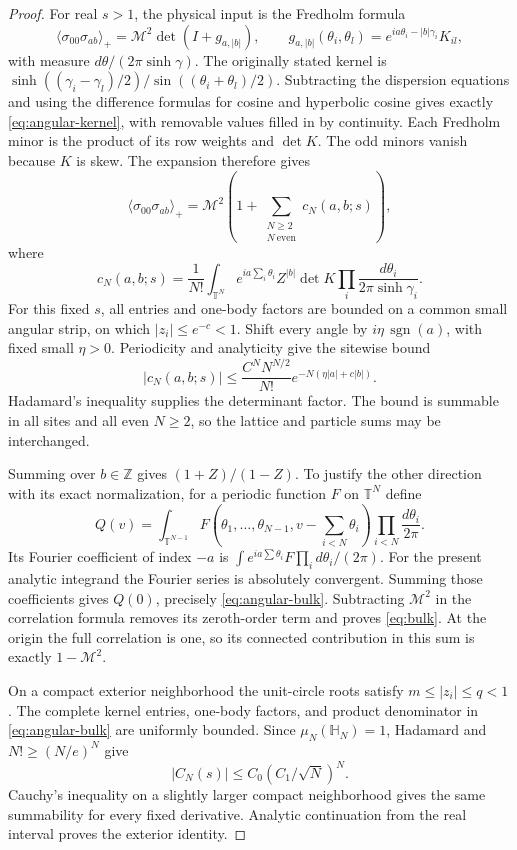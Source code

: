 \documentclass[11pt]{article}
\numberwithin{equation}{section}
\theoremstyle{remark}\newtheorem{remark}[theorem]{Remark}
\newcommand{\Mtwo}{\mathcal M^2}
\begin{document}
\begin{proof}
For real $s>1$, the physical input is the Fredholm formula
\[
 \langle\sigma_{00}\sigma_{ab}\rangle_+
       =\Mtwo\det(I+g_{a,|b|}),\qquad
 g_{a,|b|}(\theta_i,\theta_l)
       =e^{ia\theta_i-|b|\gamma_i}K_{il},
\]
with measure $d\theta/(2\pi\sinh\gamma)$.
The originally stated kernel is
$\sinh((\gamma_i-\gamma_l)/2)/\sin((\theta_i+\theta_l)/2)$.
Subtracting the dispersion equations and using the difference
formulas for cosine and hyperbolic cosine gives exactly
\eqref{eq:angular-kernel}, with removable values filled in by
continuity. Each Fredholm minor is the product of its row weights
and $\det K$. The odd minors vanish because $K$ is skew.
The expansion therefore gives
\[
 \langle\sigma_{00}\sigma_{ab}\rangle_+
   =\Mtwo\left(1+\sum_{\substack{N\ge2\\N\ \mathrm{even}}}
                         c_N(a,b;s)\right),
\]
where
\[
 c_N(a,b;s)=\frac1{N!}\int_{\mathbb T^N}
       e^{ia\sum_i\theta_i}Z^{|b|}\det K
                    \prod_i\frac{d\theta_i}{2\pi\sinh\gamma_i}.
\]
For this fixed $s$, all entries and one-body factors are bounded on
a common small angular strip, on which $|z_i|\le e^{-c}<1$.
Shift every angle by $i\eta\,\operatorname{sgn}(a)$, with fixed
small $\eta>0$. Periodicity and analyticity give the sitewise bound
\[
 |c_N(a,b;s)|\le\frac{C^N N^{N/2}}{N!}
                    e^{-N(\eta|a|+c|b|)}.
\]
Hadamard's inequality supplies the determinant factor. The bound is
summable in all sites and all even $N\ge2$, so the lattice and
particle sums may be interchanged.

Summing over $b\in\mathbb Z$ gives $(1+Z)/(1-Z)$. To justify
the other direction with its exact normalization, for a periodic
function $F$ on $\mathbb T^N$ define
\[
 Q(v)=\int_{\mathbb T^{N-1}}
 F(\theta_1,\ldots,\theta_{N-1},v-\textstyle\sum_{i<N}\theta_i)
                 \prod_{i<N}\frac{d\theta_i}{2\pi}.
\]
Its Fourier coefficient of index $-a$ is
$\int e^{ia\sum\theta_i}F\prod_i d\theta_i/(2\pi)$.
For the present analytic integrand the Fourier series is absolutely
convergent. Summing those coefficients gives $Q(0)$, precisely
\eqref{eq:angular-bulk}. Subtracting $\Mtwo$ in the correlation
formula removes its zeroth-order term and proves \eqref{eq:bulk}.
At the origin the full correlation is one, so its connected
contribution in this sum is exactly $1-\Mtwo$.

On a compact exterior neighborhood the unit-circle roots satisfy
$m\le|z_i|\le q<1$. The complete kernel entries, one-body factors,
and product denominator in \eqref{eq:angular-bulk} are uniformly
bounded. Since $\mu_N(\mathbb H_N)=1$, Hadamard and
$N!\ge(N/e)^N$ give
\[
 |C_N(s)|\le C_0(C_1/\sqrt N)^N.
\]
Cauchy's inequality on a slightly larger compact neighborhood gives
the same summability for every fixed derivative. Analytic continuation
from the real interval proves the exterior identity.
\end{proof}
\end{document}

